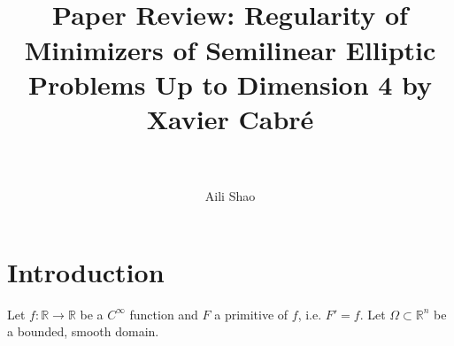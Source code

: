 \documentclass[paper=a4, fontsize=11pt]{scrartcl} %
\title{	
\normalfont \normalsize 
%
\horrule{0.5pt} \\[0.4cm] %
\huge Paper Review:  Regularity of Minimizers of Semilinear Elliptic Problems Up to Dimension 4 by Xavier Cabr\'{e}  \\ %
\horrule{2pt} \\[0.5cm] %
}
\date{}
\author{Aili Shao}
\numberwithin{equation}{section} %
\numberwithin{figure}{section} %
\numberwithin{table}{section} %
\numberwithin{exercise}{section}
\begin{document}
\maketitle %


\section{ Introduction}

Let $f\colon\mathbb{R}\to\mathbb{R}$ be a $C^{\infty}$ function and $F$ a primitive of $f$, i.e. $F'=f$. Let $\Omega\subset \mathbb{R}^n$ be a bounded, smooth domain.
\end{document}
